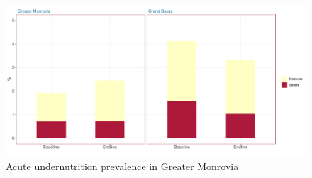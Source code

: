 \documentclass[12pt,a4paper]{article}
\begin{document}
\begin{figure}[H]

{\centering \includegraphics{liberiaCoverageFinalReport_files/figure-latex/nut1plot-1} 

}

\caption{Acute undernutrition prevalence in Greater Monrovia}\label{fig:nut1plot}
\end{figure}
\end{document}
